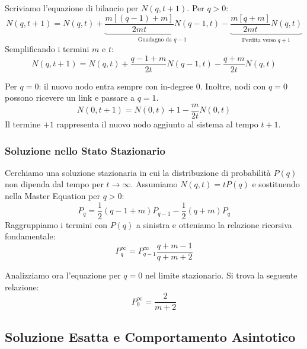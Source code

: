 \noindent Scriviamo l'equazione di bilancio per $N(q, t+1)$. Per $q > 0$:
\begin{equation}
    N(q, t+1) = N(q, t) + \underbrace{\frac{m[(q-1) + m]}{2mt} N(q-1, t)}_{\text{Guadagno da } q-1} - \underbrace{\frac{m[q + m]}{2mt} N(q, t)}_{\text{Perdita verso } q+1}
\end{equation}
Semplificando i termini $m$ e $t$:
\begin{equation}
    N(q, t+1) = N(q, t) + \frac{q - 1 + m}{2t} N(q-1, t) - \frac{q + m}{2t} N(q, t)
\end{equation}

\noindent Per $q = 0$: il nuovo nodo entra sempre con in-degree 0. Inoltre, nodi con $q=0$ possono ricevere un link e passare a $q=1$.
\begin{equation}
    N(0, t+1) = N(0, t) + 1 - \frac{m}{2t} N(0, t)
\end{equation}
Il termine $+1$ rappresenta il nuovo nodo aggiunto al sistema al tempo $t+1$.

\subsubsection{Soluzione nello Stato Stazionario}

Cerchiamo una soluzione stazionaria in cui la distribuzione di probabilità $P(q)$ non dipenda dal tempo per $t \to \infty$.
Assumiamo $N(q, t) = t P(q)$ e sostituendo nella Master Equation per $q > 0$:
\begin{equation}
    P_q = \frac{1}{2}(q - 1 + m) P_{q-1} - \frac{1}{2}(q + m) P_q
\end{equation}
Raggruppiamo i termini con $P(q)$ a sinistra e otteniamo la relazione ricorsiva fondamentale:
\begin{equation}
    P_q^\infty  = P_{q-1}^\infty  \frac{q + m - 1}{q + m + 2}
\end{equation}

\noindent Analizziamo ora l'equazione per $q=0$ nel limite stazionario. Si trova la seguente relazione:
\begin{equation}
 P_0^\infty = \frac{2}{m + 2}
\end{equation}

\subsection{Soluzione Esatta e Comportamento Asintotico}

